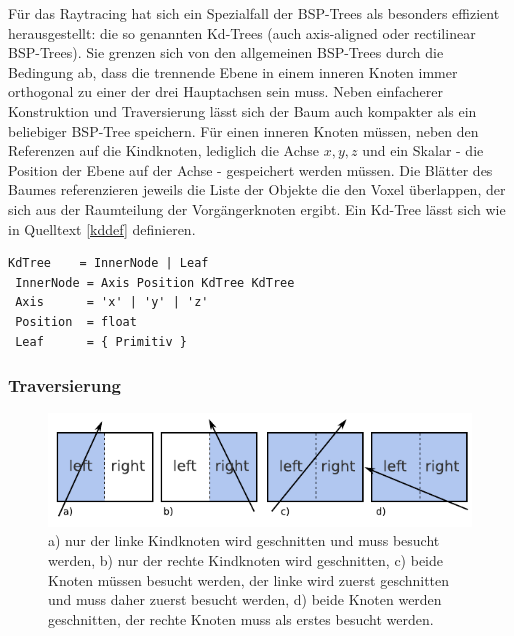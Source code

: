 Für das Raytracing hat sich ein Spezialfall der BSP-Trees als besonders effizient herausgestellt: die so genannten Kd-Trees (auch axis-aligned oder rectilinear BSP-Trees). Sie grenzen sich von den allgemeinen BSP-Trees durch die Bedingung ab, dass die trennende Ebene in einem inneren Knoten immer orthogonal zu einer der drei Hauptachsen sein muss. Neben einfacherer Konstruktion und Traversierung lässt sich der Baum auch kompakter als ein beliebiger BSP-Tree speichern. Für einen inneren Knoten müssen, neben den Referenzen auf die Kindknoten, lediglich die Achse ${x,y,z}$ und ein Skalar - die Position der Ebene auf der Achse - gespeichert werden müssen. Die Blätter des Baumes referenzieren jeweils die Liste der Objekte die den Voxel überlappen, der sich aus der Raumteilung der Vorgängerknoten ergibt. Ein Kd-Tree lässt sich wie in Quelltext \ref{kddef} definieren.

\begin{lstlisting}[float,caption=Beschreibung der Kd-Tree Daten\-struk\-tur in erweiterter Backus-""Naur-""Form,label=kddef]
 KdTree    = InnerNode | Leaf
 InnerNode = Axis Position KdTree KdTree
 Axis      = 'x' | 'y' | 'z'
 Position  = float
 Leaf      = { Primitiv }\end{lstlisting}

\subsubsection{Traversierung}
\begin{figure}\centering
\includegraphics[width=1.0\textwidth]{images/kdtrav.pdf} 
\caption[Fallunterscheidung bei Traversierung eines BSP-Trees]{a) nur der linke Kindknoten wird geschnitten und muss besucht werden, b) nur der rechte Kindknoten wird geschnitten, c) beide Knoten müssen besucht werden, der linke wird zuerst geschnitten und muss daher zuerst besucht werden, d) beide Knoten werden geschnitten, der rechte Knoten muss als erstes besucht werden.}
\label{fig:kdtrav}
\end{figure}


